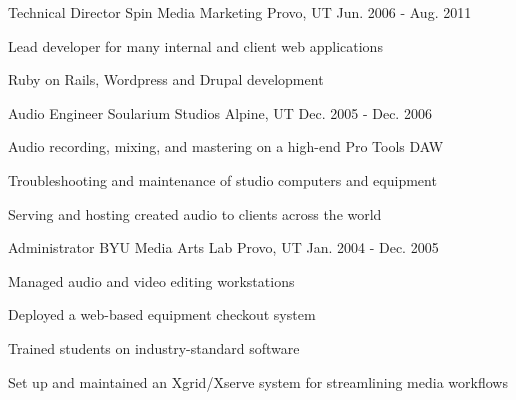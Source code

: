 \begin{cventries}
  \cventry
    {Technical Director} %
    {Spin Media Marketing} %
    {Provo, UT} %
    {Jun. 2006 - Aug. 2011} %
    {
      \begin{cvitems} %
        \item {Lead developer for many internal and client web applications}
        \item {Ruby on Rails, Wordpress and Drupal development}
      \end{cvitems}
    }

  \cventry
    {Audio Engineer} %
    {Soularium Studios} %
    {Alpine, UT} %
    {Dec. 2005 - Dec. 2006} %
    {
      \begin{cvitems} %
        \item {Audio recording, mixing, and mastering on a high-end Pro Tools DAW}
        \item {Troubleshooting and maintenance of studio computers and equipment}
        \item {Serving and hosting created audio to clients across the world}
      \end{cvitems}
    }

  \cventry
    {Administrator} %
    {BYU Media Arts Lab} %
    {Provo, UT} %
    {Jan. 2004 - Dec. 2005} %
    {
      \begin{cvitems} %
        \item {Managed audio and video editing workstations}
        \item {Deployed a web-based equipment checkout system}
        \item {Trained students on industry-standard software}
        \item {Set up and maintained an Xgrid/Xserve system for streamlining media workflows}
      \end{cvitems}
    }

\end{cventries}
